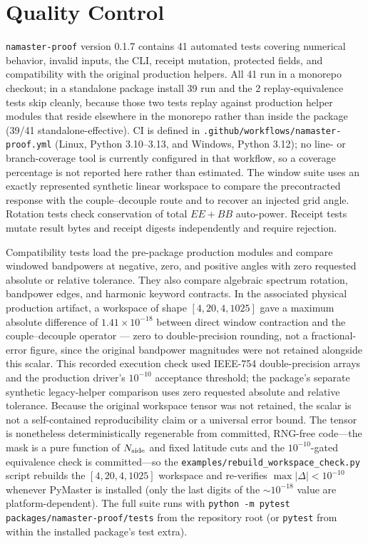 \documentclass[11pt]{article}
\newcommand{\software}{\texttt{namaster-proof}}
\begin{document}
\section{Quality Control}

\software{} version 0.1.7 contains 41 automated tests covering numerical behavior, invalid
inputs, the CLI, receipt mutation, protected fields, and compatibility with
the original production helpers.  All 41 run in a monorepo checkout; in a
standalone package install 39 run and the 2 replay-equivalence tests skip
cleanly, because those two tests replay against production helper modules that
reside elsewhere in the monorepo rather than inside the package (39/41
standalone-effective). CI is defined in
\nolinkurl{.github/workflows/namaster-proof.yml} (Linux, Python
3.10--3.13, and Windows, Python 3.12); no line- or branch-coverage tool is
currently configured in that workflow, so a coverage percentage is not
reported here rather than estimated.  The window suite uses an exactly represented
synthetic linear workspace to compare the precontracted response with the
couple--decouple route and to recover an injected grid angle.  Rotation tests
check conservation of total \(EE+BB\) auto-power.  Receipt tests mutate result
bytes and receipt digests independently and require rejection.

Compatibility tests load the pre-package production modules and compare
windowed bandpowers at negative, zero, and positive angles with zero requested
absolute or relative tolerance.  They also compare algebraic spectrum rotation,
bandpower edges, and harmonic keyword contracts.
\label{sec:workspace}
In the associated physical
production artifact, a workspace of shape
\([4,20,4,1025]\) gave a maximum absolute difference of
\(1.41\times10^{-18}\) between direct window contraction and the
couple--decouple operator --- zero to double-precision rounding, not a
fractional-error figure, since the original bandpower magnitudes were not
retained alongside this scalar. This recorded execution check used IEEE-754
double-precision arrays and the production driver's \(10^{-10}\) acceptance
threshold; the package's separate synthetic legacy-helper comparison uses
zero requested absolute and relative tolerance. Because
the original workspace tensor was not retained, the scalar is not a
self-contained reproducibility claim or a universal error bound.
The tensor is nonetheless deterministically regenerable from committed,
RNG-free code---the mask is a pure function of \(N_{\rm side}\) and fixed
latitude cuts and the \(10^{-10}\)-gated equivalence check is committed---so
the \nolinkurl{examples/rebuild_workspace_check.py} script rebuilds the
\([4,20,4,1025]\) workspace and re-verifies \(\max|\Delta|<10^{-10}\) whenever
PyMaster is installed (only the last digits of the \(\sim10^{-18}\) value are
platform-dependent). The full suite runs with
\texttt{python -m pytest packages/namaster-proof/tests} from the repository
root (or \texttt{pytest} from within the installed package's test extra).
\end{document}
